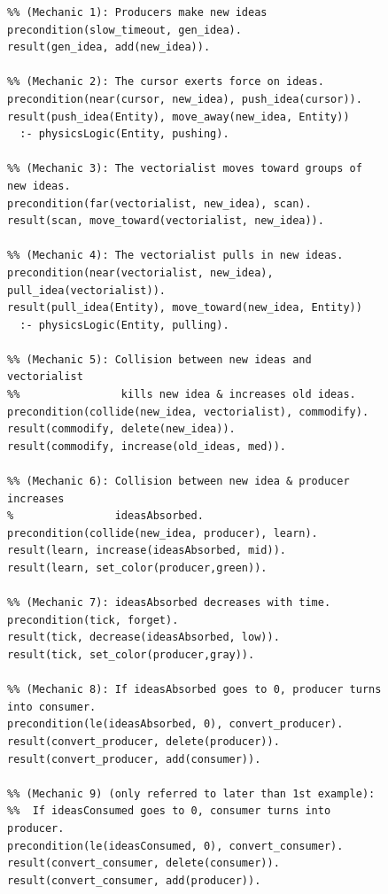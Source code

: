 \documentclass[12pt]{report}
\begin{document}
\begin{figure}[htbp!]
\footnotesize
%
%
\vspace{-2\baselineskip}
\begin{verbatim}
%% (Mechanic 1): Producers make new ideas
precondition(slow_timeout, gen_idea).
result(gen_idea, add(new_idea)).

%% (Mechanic 2): The cursor exerts force on ideas.
precondition(near(cursor, new_idea), push_idea(cursor)).
result(push_idea(Entity), move_away(new_idea, Entity))
  :- physicsLogic(Entity, pushing).

%% (Mechanic 3): The vectorialist moves toward groups of new ideas.
precondition(far(vectorialist, new_idea), scan).
result(scan, move_toward(vectorialist, new_idea)).

%% (Mechanic 4): The vectorialist pulls in new ideas.
precondition(near(vectorialist, new_idea), pull_idea(vectorialist)).
result(pull_idea(Entity), move_toward(new_idea, Entity))
  :- physicsLogic(Entity, pulling).

%% (Mechanic 5): Collision between new ideas and vectorialist
%%                kills new idea & increases old ideas.
precondition(collide(new_idea, vectorialist), commodify).
result(commodify, delete(new_idea)).
result(commodify, increase(old_ideas, med)).

%% (Mechanic 6): Collision between new idea & producer increases
%                ideasAbsorbed.
precondition(collide(new_idea, producer), learn).
result(learn, increase(ideasAbsorbed, mid)).
result(learn, set_color(producer,green)).

%% (Mechanic 7): ideasAbsorbed decreases with time.
precondition(tick, forget).
result(tick, decrease(ideasAbsorbed, low)).
result(tick, set_color(producer,gray)).

%% (Mechanic 8): If ideasAbsorbed goes to 0, producer turns into consumer.
precondition(le(ideasAbsorbed, 0), convert_producer).
result(convert_producer, delete(producer)).
result(convert_producer, add(consumer)).

%% (Mechanic 9) (only referred to later than 1st example):
%%  If ideasConsumed goes to 0, consumer turns into producer.
precondition(le(ideasConsumed, 0), convert_consumer).
result(convert_consumer, delete(consumer)).
result(convert_consumer, add(producer)).


\end{verbatim}
\end{figure}
\end{document}
